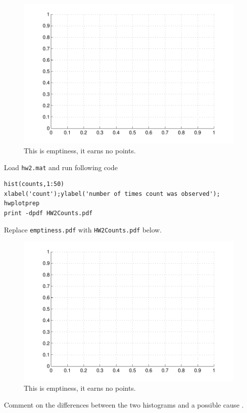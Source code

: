 \documentclass{article}
\begin{document}
{\begin{figure}[H]
\begin{center}
\includegraphics[scale=0.5]{emptiness.pdf}
\caption{This is emptiness, it earns no points.}
\end{center}
\end{figure}

Load \texttt{hw2.mat} and run following code
\begin{verbatim}
hist(counts,1:50)
xlabel('count');ylabel('number of times count was observed');
hwplotprep
print -dpdf HW2Counts.pdf
\end{verbatim}

Replace \texttt{emptiness.pdf} with \texttt{HW2Counts.pdf} below.

\begin{figure}[H]
\begin{center}
\includegraphics[scale=0.5]{emptiness.pdf}
\caption{This is emptiness, it earns no points.}
\end{center}
\end{figure}
Comment on the differences between the two histograms and a possible cause \answer.

}
\end{document}
